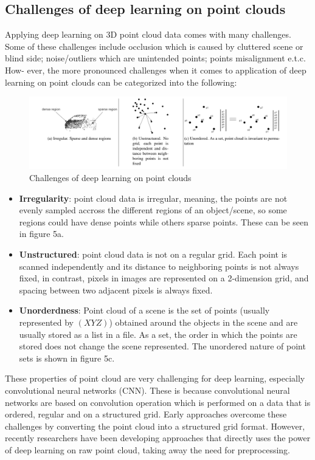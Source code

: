 \documentclass[11pt,a4paper]{article}
\begin{document}
\subsection{Challenges of deep learning on point clouds}
Applying deep learning on 3D point cloud data comes with many challenges. Some of these challenges include occlusion which is caused by cluttered scene or blind side; noise/outliers which are unintended points; points misalignment e.t.c. How- ever, the more pronounced challenges when it comes to application of deep learning on point clouds can be categorized into the following:
\begin{figure}[H]
    \centering
    \includegraphics[scale=0.7]{imgs/pointcloud-deeplearning-challenges.jpg}
    \caption{Challenges of deep learning on point clouds}
\end{figure}
\begin{itemize}
    \item \textbf{Irregularity}: point cloud data is irregular, meaning, the points are not evenly sampled accross the different regions of an object/scene, so some regions could have dense points while others sparse points. These can be seen in figure 5a.
    \item \textbf{Unstructured}: point cloud data is not on a regular grid. Each point is scanned independently and its distance to neighboring points is not always fixed, in contrast, pixels in images are represented on a 2-dimension grid, and spacing between two adjacent pixels is always fixed.
    \item \textbf{Unorderdness}: Point cloud of a scene is the set of points (usually represented by $(XYZ)$) obtained around the objects in the scene and are usually stored as a list in a file. As a set, the order in which the points are stored does not change the scene represented. The unordered nature of point sets is shown in figure 5c.
\end{itemize}
These properties of point cloud are very challenging for deep learning, especially convolutional neural networks (CNN). These is because convolutional neural networks are based on convolution operation which is performed on a data that is ordered, regular and on a structured grid. Early approaches overcome these challenges by converting the point cloud into a structured grid format. However, recently researchers have been developing approaches that directly uses the power of deep learning on raw point cloud, taking away the need for preprocessing.
\end{document}
